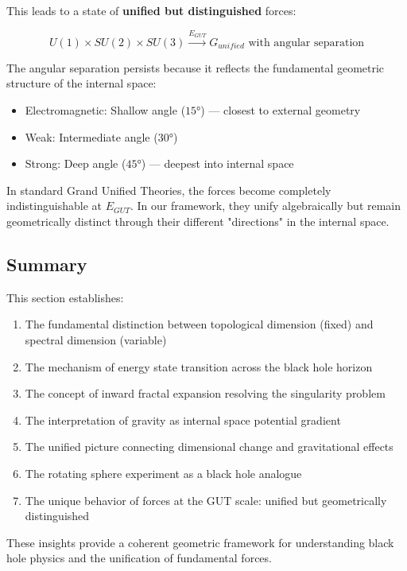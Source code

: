 This leads to a state of \textbf{unified but distinguished} forces:

\begin{equation}
    U(1) \times SU(2) \times SU(3) \xrightarrow{E_{GUT}} G_{unified} \text{ with angular separation}
\end{equation}

The angular separation persists because it reflects the fundamental geometric structure of the internal space:
\begin{itemize}
    \item Electromagnetic: Shallow angle ($15°$) --- closest to external geometry
    \item Weak: Intermediate angle ($30°$)
    \item Strong: Deep angle ($45°$) --- deepest into internal space
\end{itemize}

\begin{remark}
In standard Grand Unified Theories, the forces become completely indistinguishable at $E_{GUT}$. In our framework, they unify algebraically but remain geometrically distinct through their different "directions" in the internal space.
\end{remark}

\subsection{Summary}

This section establishes:
\begin{enumerate}
    \item The fundamental distinction between topological dimension (fixed) and spectral dimension (variable)
    \item The mechanism of energy state transition across the black hole horizon
    \item The concept of inward fractal expansion resolving the singularity problem
    \item The interpretation of gravity as internal space potential gradient
    \item The unified picture connecting dimensional change and gravitational effects
    \item The rotating sphere experiment as a black hole analogue
    \item The unique behavior of forces at the GUT scale: unified but geometrically distinguished
\end{enumerate}

These insights provide a coherent geometric framework for understanding black hole physics and the unification of fundamental forces.
